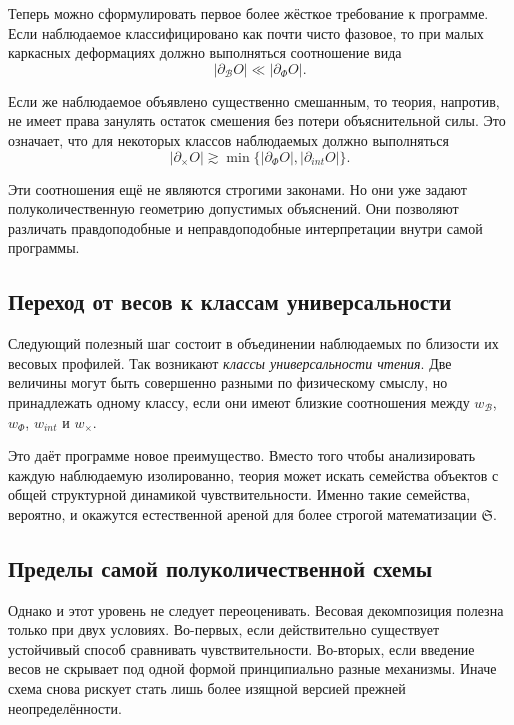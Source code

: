 \documentclass[12pt,a4paper]{article}
\begin{document}
Теперь можно сформулировать первое более жёсткое требование к программе. Если наблюдаемое классифицировано как почти чисто фазовое, то при малых каркасных деформациях должно выполняться соотношение вида
\begin{equation}
|\partial_{\mathcal{B}} O| \ll |\partial_{\Phi} O|.
\end{equation}

Если же наблюдаемое объявлено существенно смешанным, то теория, напротив, не имеет права занулять остаток смешения без потери объяснительной силы. Это означает, что для некоторых классов наблюдаемых должно выполняться
\begin{equation}
|\partial_{\times} O| \gtrsim \min\{ |\partial_{\Phi} O|, |\partial_{int} O| \}.
\end{equation}

Эти соотношения ещё не являются строгими законами. Но они уже задают полуколичественную геометрию допустимых объяснений. Они позволяют различать правдоподобные и неправдоподобные интерпретации внутри самой программы.

\subsection{Переход от весов к классам универсальности}

Следующий полезный шаг состоит в объединении наблюдаемых по близости их весовых профилей. Так возникают \textit{классы универсальности чтения}. Две величины могут быть совершенно разными по физическому смыслу, но принадлежать одному классу, если они имеют близкие соотношения между \(w_{\mathcal{B}}\), \(w_{\Phi}\), \(w_{int}\) и \(w_{\times}\).

Это даёт программе новое преимущество. Вместо того чтобы анализировать каждую наблюдаемую изолированно, теория может искать семейства объектов с общей структурной динамикой чувствительности. Именно такие семейства, вероятно, и окажутся естественной ареной для более строгой математизации \(\mathfrak{S}\).

\subsection{Пределы самой полуколичественной схемы}

Однако и этот уровень не следует переоценивать. Весовая декомпозиция полезна только при двух условиях. Во-первых, если действительно существует устойчивый способ сравнивать чувствительности. Во-вторых, если введение весов не скрывает под одной формой принципиально разные механизмы. Иначе схема снова рискует стать лишь более изящной версией прежней неопределённости.
\end{document}
